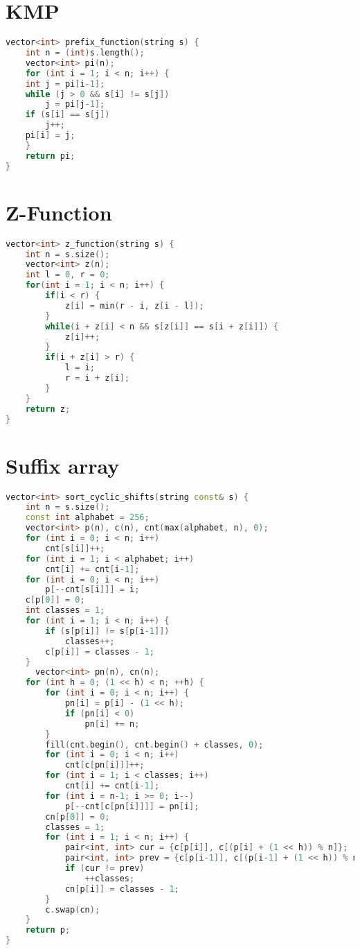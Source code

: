 \documentclass[notitlepage]{report}
\begin{document}
\section*{KMP}
\begin{lstlisting}[language=C++,basicstyle=\footnotesize]
vector<int> prefix_function(string s) {
	int n = (int)s.length();
	vector<int> pi(n);
	for (int i = 1; i < n; i++) {
	int j = pi[i-1];
	while (j > 0 && s[i] != s[j])
		j = pi[j-1];
	if (s[i] == s[j])
		j++;
	pi[i] = j;
	}
	return pi;
}
\end{lstlisting}
\section*{Z-Function}
\begin{lstlisting}[language=C++,basicstyle=\footnotesize]
vector<int> z_function(string s) {
    int n = s.size();
    vector<int> z(n);
    int l = 0, r = 0;
    for(int i = 1; i < n; i++) {
        if(i < r) {
            z[i] = min(r - i, z[i - l]);
        }
        while(i + z[i] < n && s[z[i]] == s[i + z[i]]) {
            z[i]++;
        }
        if(i + z[i] > r) {
            l = i;
            r = i + z[i];
        }
    }
    return z;
}
\end{lstlisting}
\section*{Suffix array}
\begin{lstlisting}[language=C++,basicstyle=\footnotesize]
vector<int> sort_cyclic_shifts(string const& s) {
    int n = s.size();
    const int alphabet = 256;
    vector<int> p(n), c(n), cnt(max(alphabet, n), 0);
    for (int i = 0; i < n; i++)
        cnt[s[i]]++;
    for (int i = 1; i < alphabet; i++)
        cnt[i] += cnt[i-1];
    for (int i = 0; i < n; i++)
        p[--cnt[s[i]]] = i;
    c[p[0]] = 0;
    int classes = 1;
    for (int i = 1; i < n; i++) {
        if (s[p[i]] != s[p[i-1]])
            classes++;
        c[p[i]] = classes - 1;
    }
      vector<int> pn(n), cn(n);
    for (int h = 0; (1 << h) < n; ++h) {
        for (int i = 0; i < n; i++) {
            pn[i] = p[i] - (1 << h);
            if (pn[i] < 0)
                pn[i] += n;
        }
        fill(cnt.begin(), cnt.begin() + classes, 0);
        for (int i = 0; i < n; i++)
            cnt[c[pn[i]]]++;
        for (int i = 1; i < classes; i++)
            cnt[i] += cnt[i-1];
        for (int i = n-1; i >= 0; i--)
            p[--cnt[c[pn[i]]]] = pn[i];
        cn[p[0]] = 0;
        classes = 1;
        for (int i = 1; i < n; i++) {
            pair<int, int> cur = {c[p[i]], c[(p[i] + (1 << h)) % n]};
            pair<int, int> prev = {c[p[i-1]], c[(p[i-1] + (1 << h)) % n]};
            if (cur != prev)
                ++classes;
            cn[p[i]] = classes - 1;
        }
        c.swap(cn);
    }
    return p;
}
\end{lstlisting}
\end{document}
